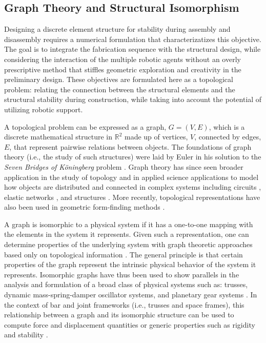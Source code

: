 \subsection{Graph Theory and Structural Isomorphism}\label{sec:2__graphs}
    Designing a discrete element structure for stability during assembly and disassembly requires a numerical formulation that characterizatizes this objective. The goal is to integrate the fabrication sequence with the structural design, while considering the interaction of the multiple robotic agents without an overly prescriptive method that stiffles geometric exploration and creativity in the preliminary design. These objectives are formulated here as a topological problem: relating the connection between the structural elements and the structural stability during construction, while taking into account the potential of utilizing robotic support.
    
    A topological problem can be expressed as a graph, $G = (V,E)$, which is a discrete mathematical structure in $\mathbb{R}^2$ made up of vertices, $V$,  connected by edges, $E$, that represent pairwise relations between objects. The foundations of graph theory (i.e., the study of such structures) were laid by Euler in his solution to the \textit{Seven Bridges of Köningberg} problem \citep{euler_solutio_1758}. Graph theory has since seen broader application in the study of topology and in applied science applications to model how objects are distributed and connected in complex systems including circuits \citep{kirby_what_2016, kirchhoff_ueber_1847}, elastic networks \citep{kron_elastic_1962}, and structures \citep{fenves_network-topological_1963, fenves_structural_1966, lind_analysis_1963}. More recently, topological representations have also been used in geometric form-finding methods \citep{block_thrust_2007, ohlbrock_computer-aided_2020, pastrana_constrained_2021}.
    
    A graph is isomorphic to a physical system if it has a one-to-one mapping with the elements in the system it represents. Given such a representation, one can determine properties of the underlying system with graph theoretic approaches based only on topological information \citep{shai_isomorphic_1999}. The general principle is that certain properties of the graph represent the intrinsic physical behavior of the system it represents. Isomorphic graphs have thus been used to show parallels in the analysis and formulation of a broad class of physical systems such as: trusses, dynamic mass-spring-damper oscillator systems, and planetary gear systems \citep{shai_representation_1998, shai_graph_1999, shai_isomorphic_1999}. In the context of bar and joint frameworks (i.e., trusses and space frames), this relationship between a graph and its isomorphic structure can be used to compute force and displacement quantities \citep{kaveh_structural_1992, kaveh_role_2005, shai_representation_1998} or generic properties such as rigidity and stability \citep{shai_isomorphic_1999}.
    
